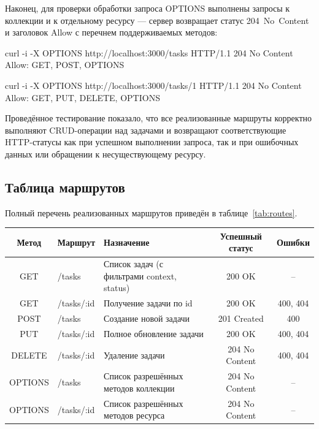 \documentclass{stp}
\begin{document}
Наконец, для проверки обработки запроса OPTIONS выполнены запросы к
коллекции и к отдельному ресурсу — сервер возвращает статус
204~No~Content и заголовок Allow с перечнем поддерживаемых
методов:

\begin{stplisting}
curl -i -X OPTIONS http://localhost:3000/tasks
HTTP/1.1 204 No Content
Allow: GET, POST, OPTIONS

curl -i -X OPTIONS http://localhost:3000/tasks/1
HTTP/1.1 204 No Content
Allow: GET, PUT, DELETE, OPTIONS
\end{stplisting}

Проведённое тестирование показало, что все реализованные маршруты
корректно выполняют CRUD-операции над задачами и возвращают
соответствующие HTTP-статусы как при успешном выполнении запроса, так
и при ошибочных данных или обращении к несуществующему ресурсу.

\subsection{Таблица маршрутов}

Полный перечень реализованных маршрутов приведён в
таблице~\ref{tab:routes}.

\begin{stptable}
  \caption{Маршруты разработанного REST API}\label{tab:routes}
  \begin{tabularx}{\linewidth}{|c|X|X|c|c|}\hline
    Метод & Маршрут & Назначение & Успешный статус & Ошибки\\\hline
    GET & /tasks & Список задач (с фильтрами context, status) & 200 OK & --\\\hline
    GET & /tasks/:id & Получение задачи по id & 200 OK & 400, 404\\\hline
    POST & /tasks & Создание новой задачи & 201 Created & 400\\\hline
    PUT & /tasks/:id & Полное обновление задачи & 200 OK & 400, 404\\\hline
    DELETE & /tasks/:id & Удаление задачи & 204 No Content & 400, 404\\\hline
    OPTIONS & /tasks & Список разрешённых методов коллекции & 204 No Content & --\\\hline
    OPTIONS & /tasks/:id & Список разрешённых методов ресурса & 204 No Content & --\\\hline
  \end{tabularx}
\end{stptable}
\end{document}
